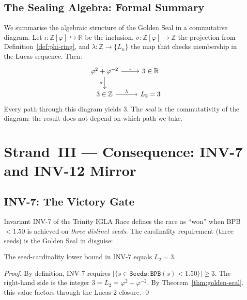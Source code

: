 \subsection{The Sealing Algebra: Formal Summary}

We summarise the algebraic structure of the Golden Seal in a
commutative diagram.  Let $\iota :
\mathbb{Z}[\varphi] \hookrightarrow \mathbb{R}$ be the
inclusion, $\sigma : \mathbb{Z}[\varphi] \to \mathbb{Z}$ the
projection from Definition~\ref{def:phi-ring}, and
$\lambda : \mathbb{Z} \to \{L_n\}$ the map that checks
membership in the Lucas sequence.  Then:
\[
  \begin{tikzcd}
    \varphi^2 + \varphi^{-2} \ar[r, "\iota"] \ar[d, "\sigma"']
      & 3 \in \mathbb{R} \\
    3 \in \mathbb{Z} \ar[r, "\lambda"]
      & L_2 = 3
  \end{tikzcd}
\]
Every path through this diagram yields $3$.  The
\emph{seal} is the commutativity of the diagram: the result
does not depend on which path we take.

\section{Strand~III — Consequence: INV-7 and INV-12 Mirror}
\label{sec:gs-strand-iii}

\subsection{INV-7: The Victory Gate}

Invariant INV-7 of the Trinity IGLA Race defines the race
as ``won'' when BPB $< 1.50$ is achieved on \emph{three
distinct seeds}.  The cardinality requirement (three seeds)
is the Golden Seal in disguise:

\begin{proposition}\label{prop:inv7-mirror}
The seed-cardinality lower bound in INV-7 equals $L_2 = 3$.
\end{proposition}

\begin{proof}
By definition, INV-7 requires $|\{s \in \texttt{Seeds} :
\texttt{BPB}(s) < 1.50\}| \geq 3$.  The right-hand side is
the integer $3 = L_2 = \varphi^2 + \varphi^{-2}$.  By
Theorem~\ref{thm:golden-seal}, this value factors through the
Lucas-2 closure.
\qed
\end{proof}

